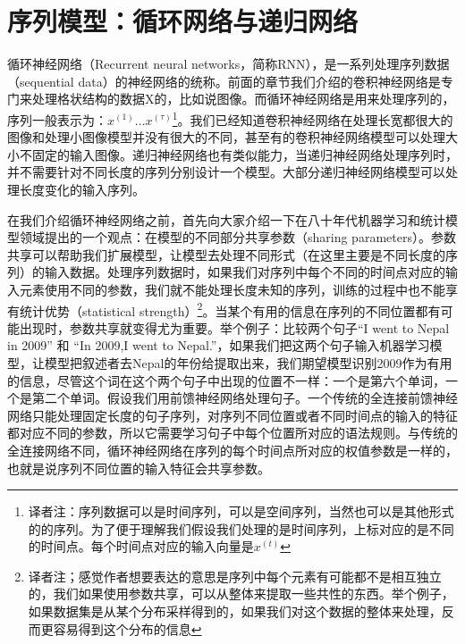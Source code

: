 
\chapter{序列模型：循环网络与递归网络}
\label{chap:10}
循环神经网络（Recurrent neural networks，简称RNN），是一系列处理序列数据（sequential data）的神经网络的统称。前面的章节我们介绍的卷积神经网络是专门来处理格状结构的数据X的，比如说图像。而循环神经网络是用来处理序列的，序列一般表示为：$x^{(1)}...x^{(\tau)}$\footnote{译者注：序列数据可以是时间序列，可以是空间序列，当然也可以是其他形式的的序列。为了便于理解我们假设我们处理的是时间序列，上标对应的是不同的时间点。每个时间点对应的输入向量是$x^{(t)}$}。我们已经知道卷积神经网络在处理长宽都很大的图像和处理小图像模型并没有很大的不同，甚至有的卷积神经网络模型可以处理大小不固定的输入图像。递归神经网络也有类似能力，当递归神经网络处理序列时，并不需要针对不同长度的序列分别设计一个模型。大部分递归神经网络模型可以处理长度变化的输入序列。

在我们介绍循环神经网络之前，首先向大家介绍一下在八十年代机器学习和统计模型领域提出的一个观点：在模型的不同部分共享参数（sharing parameters）。参数共享可以帮助我们扩展模型，让模型去处理不同形式（在这里主要是不同长度的序列）的输入数据。处理序列数据时，如果我们对序列中每个不同的时间点对应的输入元素使用不同的参数，我们就不能处理长度未知的序列，训练的过程中也不能享有统计优势（statistical strength）\footnote{译者注；感觉作者想要表达的意思是序列中每个元素有可能都不是相互独立的，我们如果使用参数共享，可以从整体来提取一些共性的东西。举个例子，如果数据集是从某个分布采样得到的，如果我们对这个数据的整体来处理，反而更容易得到这个分布的信息}。当某个有用的信息在序列的不同位置都有可能出现时，参数共享就变得尤为重要。举个例子：比较两个句子“I went to Nepal in 2009”  和 “In 2009,I went to Nepal.”，如果我们把这两个句子输入机器学习模型，让模型把叙述者去Nepal的年份给提取出来，我们期望模型识别2009作为有用的信息，尽管这个词在这个两个句子中出现的位置不一样：一个是第六个单词，一个是第二个单词。假设我们用前馈神经网络处理句子。一个传统的全连接前馈神经网络只能处理固定长度的句子序列，对序列不同位置或者不同时间点的输入的特征都对应不同的参数，所以它需要学习句子中每个位置所对应的语法规则。与传统的全连接网络不同，循环神经网络在序列的每个时间点所对应的权值参数是一样的，也就是说序列不同位置的输入特征会共享参数。

